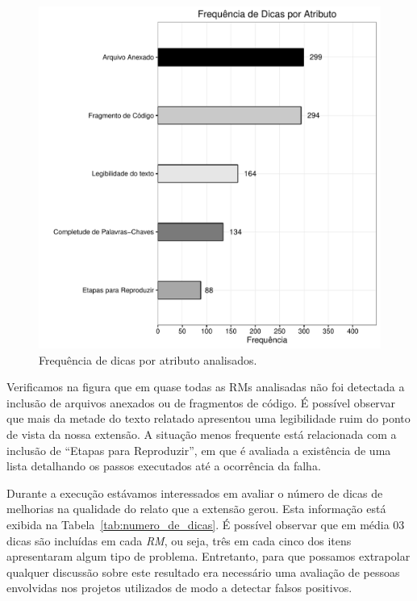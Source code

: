 \begin{figure}[htpb]
    \centering
    \includegraphics[width=0.5\linewidth]{chapter-implementacao-extensoes-fgrm/img/grafico_implementacao_extensao_freq_dicas_atributo.pdf}
    \caption{Frequência de dicas por atributo analisados.}
\label{fig:frequencia_atributos_comentario}
\end{figure}

Verificamos na figura que em quase todas as RMs analisadas não foi detectada a
inclusão de arquivos anexados ou de fragmentos de código. É possível observar
que mais da metade do texto relatado apresentou uma legibilidade ruim do ponto
de vista da nossa extensão. A situação menos frequente está relacionada com a
inclusão de ``Etapas para Reproduzir'', em que é avaliada a existência de uma
lista detalhando os passos executados até a ocorrência da falha.

\begin{table}[htpb]
\centering
{}
\caption{Número de dicas retornadas pela extensão.}
\label{tab:numero_de_dicas}
\end{table}

Durante a execução estávamos interessados em avaliar o número de dicas de
melhorias na qualidade do relato que a extensão gerou. Esta informação está
exibida na Tabela~\ref{tab:numero_de_dicas}. É possível observar que em média 03
dicas são incluídas em cada \textit{RM}, ou seja, três em cada cinco dos itens
apresentaram algum tipo de problema. Entretanto, para que possamos extrapolar
qualquer discussão sobre este resultado era necessário uma avaliação de pessoas
envolvidas nos projetos utilizados de modo a detectar falsos positivos.

